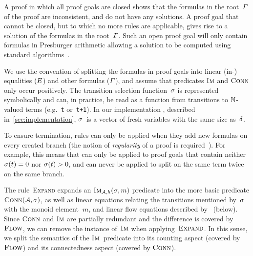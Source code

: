 A proof in which all proof goals are closed shows that the formulas
in the root~$\varGamma$ of the proof are inconsistent, and do not
have any solutions. A proof goal that cannot be closed, but to which no
more rules are applicable, gives rise to  a solution of the formulas in the
root~$\varGamma$. Such an open proof goal will only contain formulas
in Presburger arithmetic allowing a solution to be computed using
standard algorithms~\cite{DBLP:books/daglib/0022394}.

We use the convention of splitting the formulas in proof goals into
linear (in-) equalities ($E$) and other formulas
($\varGamma$), and assume that predicates $\operatorname{\textsc{Im}}$ and $\operatorname{\textsc{Conn}}$
only occur positively.
%
The transition selection function~$\operatorname{\sigma}$ is represented
symbolically and can, in practice, be read as a function from
transitions to $\mathbb{N}$-valued terms (e.g.~\texttt{t}
or~\texttt{t+1}). In our implementation \Catra{}, described 
in~\cref{sec:implementation}, $\operatorname{\sigma}$~is a vector of fresh variables
with the same size as~$\delta$.

To ensure termination, rules can only be applied when they add new formulas
on every created branch (the notion of \emph{regularity} of a proof is
required~\cite{Fitting96a}). For example, this means that \Split{} can
only be applied to proof goals that contain neither
$\operatorname{\sigma}(t) = 0$ nor $\operatorname{\sigma}(t) > 0$, and can
never be applied to split on the same term twice on the same branch.

The rule~\textsc{Expand} expands an $\operatorname{\textsc{Im}}_{\mathcal{A}, h}(\operatorname{\sigma}, m)$
predicate into the more basic predicate
$\operatorname{\textsc{Conn}}(\mathcal{A}, \operatorname{\sigma})$, as well as linear equations
relating the transitions mentioned by~$\operatorname{\sigma}$ with the monoid
element~$m$, and linear flow equations described
by~\FlowEq{} (below). Since $\operatorname{\textsc{Conn}}$ and $\operatorname{\textsc{Im}}$ are partially
redundant and the difference is covered by~$\textsc{Flow}$, we can remove
the instance of~$\operatorname{\textsc{Im}}$ when applying~$\textsc{Expand}$. In this sense, we
split the semantics of the $\operatorname{\textsc{Im}}$~predicate into its counting aspect
(covered by $\textsc{Flow}$) and its connectedness aspect (covered by
$\operatorname{\textsc{Conn}}$).

